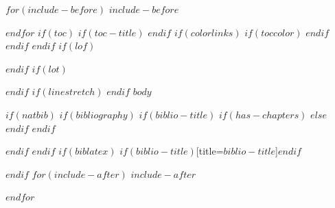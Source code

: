 \documentclass[
$for(babel-otherlangs)$
  $babel-otherlangs$,
$endfor$
$if(babel-lang)$
  $babel-lang$,
$endif$
$if(fontsize)$
  $fontsize$,
$endif$
$if(papersize)$
  $papersize$paper,
$endif$
$for(classoption)$
  $classoption$$sep$,
$endfor$
]{$documentclass$}
\begin{document}
$for(include-before)$
$include-before$

$endfor$
$if(toc)$
$if(toc-title)$
\renewcommand*\contentsname{$toc-title$}
$endif$
{
$if(colorlinks)$
$if(toccolor)$
\hypersetup{linkcolor=$toccolor$}
$endif$
$endif$
\setcounter{tocdepth}{$toc-depth$}
\footnotesize
\setlength{\parskip}{0pt}
\tableofcontents
\normalsize
}
\clearpage
$endif$
$if(lof)$
\listoffigures
$endif$
$if(lot)$
\listoftables
$endif$
$if(linestretch)$
$endif$
$body$

$if(natbib)$
$if(bibliography)$
$if(biblio-title)$
$if(has-chapters)$
\renewcommand\bibname{$biblio-title$}
$else$
\renewcommand\refname{$biblio-title$}
$endif$
$endif$


$endif$
$endif$
$if(biblatex)$
\printbibliography$if(biblio-title)$[title=$biblio-title$]$endif$

$endif$
$for(include-after)$
$include-after$

$endfor$
\end{document}
